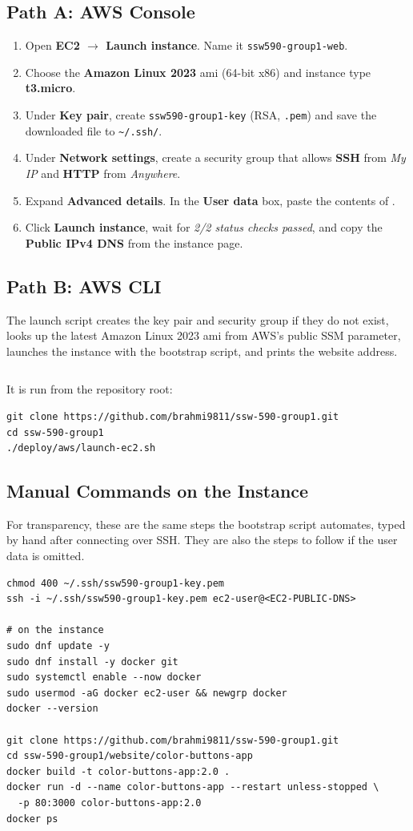 \subsection{Path A: AWS Console}
\begin{enumerate}
\item Open \textbf{EC2 $\rightarrow$ Launch instance}. Name it
\texttt{ssw590-group1-web}.
\item Choose the \textbf{Amazon Linux 2023} \gls{ami} (64-bit x86) and instance
type \textbf{t3.micro}.
\item Under \textbf{Key pair}, create \texttt{ssw590-group1-key} (RSA,
\texttt{.pem}) and save the downloaded file to \texttt{\textasciitilde/.ssh/}.
\item Under \textbf{Network settings}, create a security group that allows
\textbf{SSH} from \emph{My IP} and \textbf{HTTP} from \emph{Anywhere}.
\item Expand \textbf{Advanced details}. In the \textbf{User data} box, paste
the contents of .
\item Click \textbf{Launch instance}, wait for \emph{2/2 status checks passed},
and copy the \textbf{Public IPv4 DNS} from the instance page.
\end{enumerate}

\subsection{Path B: AWS CLI}
\label{Section:AWSCLI}
The launch script creates the key pair and security group if they do not exist,
looks up the latest Amazon Linux 2023 \gls{ami} from AWS's public SSM parameter,
launches the instance with the bootstrap script, and prints the website address.
\inputminted{bash}{../deploy/aws/launch-ec2.sh}
It is run from the repository root:
\begin{verbatim}
git clone https://github.com/brahmi9811/ssw-590-group1.git
cd ssw-590-group1
./deploy/aws/launch-ec2.sh
\end{verbatim}

\subsection{Manual Commands on the Instance}
\label{Section:ManualCommands}
For transparency, these are the same steps the bootstrap script automates,
typed by hand after connecting over SSH. They are also the steps to follow if
the user data is omitted.
\begin{verbatim}
chmod 400 ~/.ssh/ssw590-group1-key.pem
ssh -i ~/.ssh/ssw590-group1-key.pem ec2-user@<EC2-PUBLIC-DNS>

# on the instance
sudo dnf update -y
sudo dnf install -y docker git
sudo systemctl enable --now docker
sudo usermod -aG docker ec2-user && newgrp docker
docker --version

git clone https://github.com/brahmi9811/ssw-590-group1.git
cd ssw-590-group1/website/color-buttons-app
docker build -t color-buttons-app:2.0 .
docker run -d --name color-buttons-app --restart unless-stopped \
  -p 80:3000 color-buttons-app:2.0
docker ps
\end{verbatim}

